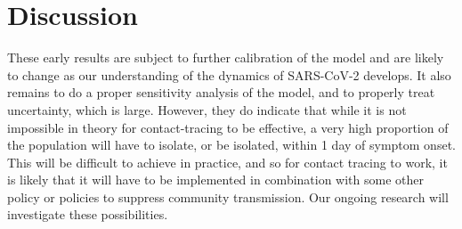 \documentclass{article}
\begin{document}
\section{Discussion}

These early results are subject to further calibration of the model and are likely to change as our understanding of the dynamics of SARS-CoV-2 develops. It also remains to do a proper sensitivity analysis of the model, and to properly treat uncertainty, which is large. However, they do indicate that while it is not impossible in theory for contact-tracing to be effective, a very high proportion of the population will have to isolate, or be isolated, within 1 day of symptom onset. This will be difficult to achieve in practice, and so for contact tracing to work, it is likely that it will have to be implemented in combination with some other policy or policies to suppress community transmission. Our ongoing research will investigate these possibilities.

\pagebreak
%
% 


\end{document}
